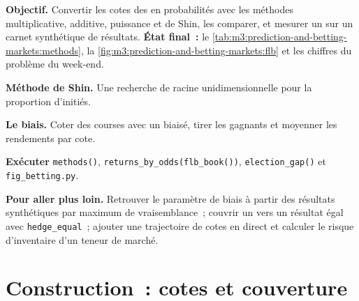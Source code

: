 \begin{tutorial}
\textbf{Objectif.} Convertir les cotes des  en probabilités avec les méthodes multiplicative, additive, puissance et de Shin, les comparer, et mesurer un
 sur un carnet synthétique de résultats. \textbf{État final~:} le \cref{tab:m3:prediction-and-betting-markets:methods},
la \cref{fig:m3:prediction-and-betting-markets:flb} et les chiffres du problème du week-end.
\begin{tutsteps}
\item \textbf{Méthode de Shin.} Une recherche de racine unidimensionnelle pour la proportion d'initiés.
\label{lst:m3:prediction-and-betting-markets:shin}
\item \textbf{Le biais.} Coter des courses avec un  biaisé, tirer les gagnants et moyenner les rendements par cote.
\label{lst:m3:prediction-and-betting-markets:flb}
\item \textbf{Exécuter} \texttt{methods()}, \texttt{returns\_by\_odds(flb\_book())}, \texttt{election\_gap()} et \texttt{fig\_betting.py}.
\end{tutsteps}
\textbf{Pour aller plus loin.} Retrouver le paramètre de biais à partir des résultats synthétiques par maximum de vraisemblance~; couvrir un  vers un résultat égal avec
\texttt{hedge\_equal}~; ajouter une trajectoire de cotes en direct et calculer le risque d'inventaire d'un teneur de marché.
\end{tutorial}

\section{Construction~: cotes et couverture}\label{bld:m3:prediction-and-betting-markets:odds}

